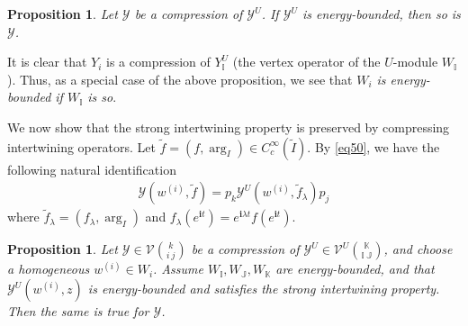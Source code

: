 \documentclass[11pt,b5paper,notitlepage]{article}
\theoremstyle{definition}
\theoremstyle{plain}
\newtheorem{pp}[df]{Proposition}
\newcommand{\mc}{\mathcal}
\newcommand{\wtd}{\widetilde}
\newcommand{\im}{\mathbf{i}}
\newcommand{\mbb}{\mathbb}
\numberwithin{equation}{subsection}
\begin{document}
\begin{pp}\label{lb90}
	Let $\mc Y$ be a compression of $\mc Y^U$. If $\mc Y^U$ is energy-bounded, then so is $\mc Y$.
\end{pp}

It is clear that $Y_i$  is a compression of $Y^U_{\mbb I}$ (the vertex operator of the $U$-module $W_{\mbb I}$). Thus, as a special case of the above proposition, we see that \emph{$W_i$ is energy-bounded if $W_{\mbb I}$ is so}. 


We now show that the strong intertwining property is preserved by compressing intertwining operators. Let $\wtd f=(f,\arg_I)\in C_c^\infty(\wtd I)$. By \eqref{eq50}, we have the following natural identification
\begin{align}
\mc Y(w^{(i)},\wtd f)=p_k\mc Y^U(w^{(i)},\wtd f_\lambda)p_j
\end{align}
where $\wtd f_\lambda=(f_\lambda,\arg_I)$ and $f_\lambda(e^{\im t})=e^{\im\lambda t}f(e^{\im t})$.

\begin{pp}\label{lb91}
	Let $\mc Y\in\mc V{k\choose i~j}$ be a compression of  $\mc Y^U\in\mc V^U{\mbb K\choose \mbb I~\mbb J}$, and choose a homogeneous $w^{(i)}\in W_i$. Assume  $W_{\mbb I},W_{\mbb J},W_{\mbb K}$ are  energy-bounded, and that $\mc Y^U(w^{(i)},z)$ is energy-bounded and satisfies the strong intertwining property. Then the same is true for $\mc Y$.
\end{pp}
\end{document}
